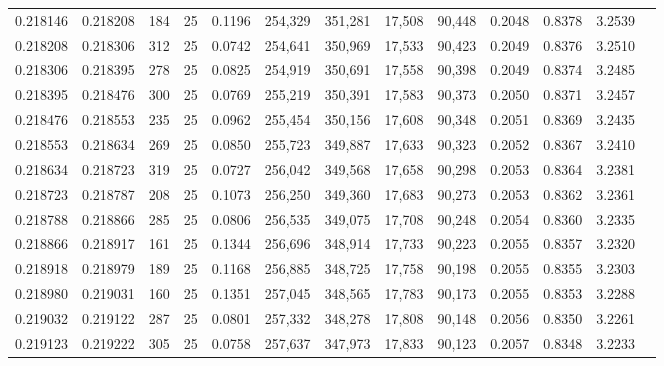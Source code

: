 \begin{tabular}{rrrrrrrrrrrrr}
0.218146 & 0.218208 &   184 &  25 &                                     0.1196 & 254,329 & 351,281 &  17,508 &  90,448 & 0.2048 & 0.8378 & 3.2539 \\
0.218208 & 0.218306 &   312 &  25 &                                     0.0742 & 254,641 & 350,969 &  17,533 &  90,423 & 0.2049 & 0.8376 & 3.2510 \\
0.218306 & 0.218395 &   278 &  25 &                                     0.0825 & 254,919 & 350,691 &  17,558 &  90,398 & 0.2049 & 0.8374 & 3.2485 \\
0.218395 & 0.218476 &   300 &  25 &                                     0.0769 & 255,219 & 350,391 &  17,583 &  90,373 & 0.2050 & 0.8371 & 3.2457 \\
0.218476 & 0.218553 &   235 &  25 &                                     0.0962 & 255,454 & 350,156 &  17,608 &  90,348 & 0.2051 & 0.8369 & 3.2435 \\
0.218553 & 0.218634 &   269 &  25 &                                     0.0850 & 255,723 & 349,887 &  17,633 &  90,323 & 0.2052 & 0.8367 & 3.2410 \\
0.218634 & 0.218723 &   319 &  25 &                                     0.0727 & 256,042 & 349,568 &  17,658 &  90,298 & 0.2053 & 0.8364 & 3.2381 \\
0.218723 & 0.218787 &   208 &  25 &                                     0.1073 & 256,250 & 349,360 &  17,683 &  90,273 & 0.2053 & 0.8362 & 3.2361 \\
0.218788 & 0.218866 &   285 &  25 &                                     0.0806 & 256,535 & 349,075 &  17,708 &  90,248 & 0.2054 & 0.8360 & 3.2335 \\
0.218866 & 0.218917 &   161 &  25 &                                     0.1344 & 256,696 & 348,914 &  17,733 &  90,223 & 0.2055 & 0.8357 & 3.2320 \\
0.218918 & 0.218979 &   189 &  25 &                                     0.1168 & 256,885 & 348,725 &  17,758 &  90,198 & 0.2055 & 0.8355 & 3.2303 \\
0.218980 & 0.219031 &   160 &  25 &                                     0.1351 & 257,045 & 348,565 &  17,783 &  90,173 & 0.2055 & 0.8353 & 3.2288 \\
0.219032 & 0.219122 &   287 &  25 &                                     0.0801 & 257,332 & 348,278 &  17,808 &  90,148 & 0.2056 & 0.8350 & 3.2261 \\
0.219123 & 0.219222 &   305 &  25 &                                     0.0758 & 257,637 & 347,973 &  17,833 &  90,123 & 0.2057 & 0.8348 & 3.2233 \\

\end{tabular}
